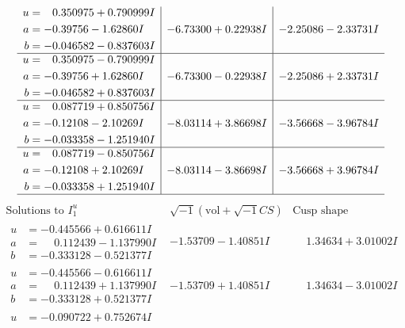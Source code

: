 \documentclass[1p]{elsarticle_modified}
\theoremstyle{definition}
\newcommand{\I}{\sqrt{-1}}
\begin{document}
$$\begin{array}{c|c|c}
\begin{aligned}
u &= \phantom{-}0.350975 + 0.790999 I \\
a &= -0.39756 - 1.62860 I \\
b &= -0.046582 - 0.837603 I\end{aligned}
 & -6.73300 + 0.22938 I & -2.25086 - 2.33731 I \\ \hline\begin{aligned}
u &= \phantom{-}0.350975 - 0.790999 I \\
a &= -0.39756 + 1.62860 I \\
b &= -0.046582 + 0.837603 I\end{aligned}
 & -6.73300 - 0.22938 I & -2.25086 + 2.33731 I \\ \hline\begin{aligned}
u &= \phantom{-}0.087719 + 0.850756 I \\
a &= -0.12108 - 2.10269 I \\
b &= -0.033358 - 1.251940 I\end{aligned}
 & -8.03114 + 3.86698 I & -3.56668 - 3.96784 I \\ \hline\begin{aligned}
u &= \phantom{-}0.087719 - 0.850756 I \\
a &= -0.12108 + 2.10269 I \\
b &= -0.033358 + 1.251940 I\end{aligned}
 & -8.03114 - 3.86698 I & -3.56668 + 3.96784 I\\
 \hline 
 \end{array}$$\newpage$$\begin{array}{c|c|c}  
\text{Solutions to }I^u_{1}& \I (\text{vol} + \sqrt{-1}CS) & \text{Cusp shape}\\
 \hline 
\begin{aligned}
u &= -0.445566 + 0.616611 I \\
a &= \phantom{-}0.112439 - 1.137990 I \\
b &= -0.333128 - 0.521377 I\end{aligned}
 & -1.53709 - 1.40851 I & \phantom{-}1.34634 + 3.01002 I \\ \hline\begin{aligned}
u &= -0.445566 - 0.616611 I \\
a &= \phantom{-}0.112439 + 1.137990 I \\
b &= -0.333128 + 0.521377 I\end{aligned}
 & -1.53709 + 1.40851 I & \phantom{-}1.34634 - 3.01002 I \\ \hline\begin{aligned}
u &= -0.090722 + 0.752674 I \\

\end{aligned}
\end{array}$$
\end{document}
